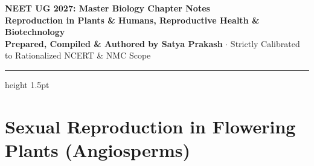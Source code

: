 \documentclass[10pt,a4paper]{article}
\begin{document}
\begin{center}
  {\Huge \textbf{NEET UG 2027: Master Biology Chapter Notes}}\\[6pt]
  {\Large \textbf{Reproduction in Plants \& Humans, Reproductive Health \& Biotechnology}}\\[4pt]
  {\small \textbf{Prepared, Compiled \& Authored by Satya Prakash} $\cdot$ Strictly Calibrated to Rationalized NCERT \& NMC Scope}
  \vspace{4pt}
  \hrule height 1.5pt
\end{center}

\pagestyle{fancy}
\fancyhf{}
\fancyfoot[C]{\thepage}

\section{Sexual Reproduction in Flowering Plants (Angiosperms)}
\end{document}
